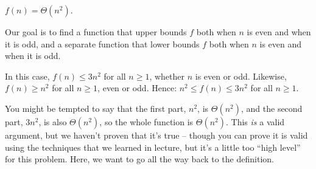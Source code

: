 \begin{prob}
\begin{subprobset}
\begin{subprob}
            \begin{soln}
                $f(n) = \Theta(n^2)$.
                
                Our goal is to find a function that upper bounds $f$ both when $n$ is even and when it is odd, and a separate
                function that lower bounds $f$ both when $n$ is even and when it is odd.

                In this case, $f(n) \leq 3n^2$ for all $n \geq 1$, whether $n$ is even or odd.
                Likewise, $f(n) \geq n^2$ for all $n \geq 1$, even or odd. Hence:
                $n^2 \leq f(n) \leq 3n^2$ for all $n \geq 1$.
                
                You might be tempted to say that the first part, $n^2$, is $\Theta(n^2)$, and 
                the second part, $3n^2$, is also $\Theta(n^2)$, so the whole function is $\Theta(n^2)$.
                This \emph{is} a valid argument, but we haven't proven that it's true -- though you can
                prove it is valid using the techniques that
                we learned in lecture, but it's a little too ``high level'' for this problem. Here, we
                want to go all the way back to the definition.
            \end{soln}
        \end{subprob}
    \end{subprobset}
\end{prob}
